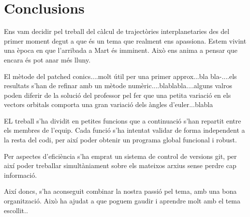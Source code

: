 \chapter{Conclusions}
Ens vam decidir pel treball del càlcul de trajectòries interplanetaries des del primer moment degut a que és un tema que realment ens apassiona. Estem vivint una època en que l'arribada a Mart és imminent. Això ens anima a pensar que encara és pot anar més lluny.

El mètode del patched conics....molt útil per una primer approx...bla bla-....els resultats s'han de refinar amb un mètode numèric....blablabla....alguns valros poden diferir de la solució del professor pel fer que una petita variació en els vectors orbitals comporta una gran variació dels àngles d'euler...blabla

EL treball s'ha dividit en petites funcions que a continuació s'han repartit entre els membres de l'equip. Cada funció s'ha intentat validar de forma independent a la resta del codi, per així poder obtenir un programa global funcional i robust.

Per aspectes d'eficiència s'ha emprat un sistema de control de versions git, per així poder treballar simultàniament sobre els mateixos arxius sense perdre cap informació.

Així doncs, s'ha aconseguit combinar la nostra passió pel tema, amb una bona organització. Això ha ajudat a que poguem gaudir i aprendre molt amb el tema escollit..
